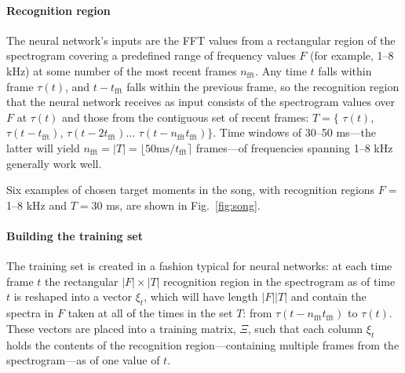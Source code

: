 \documentclass[10pt,letterpaper]{article}
\newcommand\fig[1]{Fig.~\ref{#1}}
\let\oldmarginpar\marginpar
\renewcommand{\marginpar}[1]{\oldmarginpar{\linespread{1}\scriptsize{#1}}}
\renewcommand{\subsubsection}[1]{\paragraph{#1}}
\begin{document}
\subsubsection{Recognition region}
\label{sec:recognitionregion}

The neural network's inputs are the FFT values from a rectangular
region of the spectrogram covering a predefined range of frequency
values $F$ (for example, 1--8 kHz) at some number of the most recent
frames $n_\textrm{fft}$.  Any time $t$ falls within frame $\tau(t)$,
and $t-t_\textrm{fft}$ falls within the previous frame, so the
recognition region that the neural network receives as input consists
of the spectrogram values over $F$ at $\tau(t)$ and those from the
contiguous set of recent frames: $T = \{$ $\tau(t)$,
$\tau(t-t_\textrm{fft})$, $\tau(t-{2t_\textrm{fft}})\ldots$
$\tau(t-n_\textrm{fft}t_\textrm{fft})\}$.  Time windows of 30--50
ms---the latter will yield $n_\textrm{fft} = |T|=\lfloor 50\textrm{
  ms}/t_\textrm{fft}\rceil$ frames---of frequencies spanning 1--8 kHz
generally work well.

Six examples of chosen target moments in the song, with recognition
regions $F =$ 1--8 kHz and $T=30$ ms, are shown in \fig{fig:song}.




\subsubsection{Building the training set}

The training set is created in a fashion typical for neural networks:
at each time frame $t$ the rectangular $|F|\times |T|$ recognition
region in the spectrogram as of time $t$ is reshaped into a vector
$\xi_t$, which will have length $|F||T|$ and contain the spectra in
$F$ taken at all of the times in the set $T$: from
$\tau(t-n_\textrm{fft}t_\textrm{fft})$ to $\tau(t)$.  These vectors
are placed into a training matrix, $\Xi$, such that each column
$\xi_t$ holds the contents of the recognition region---containing
multiple frames from the spectrogram---as of one value of $t$.
\end{document}
